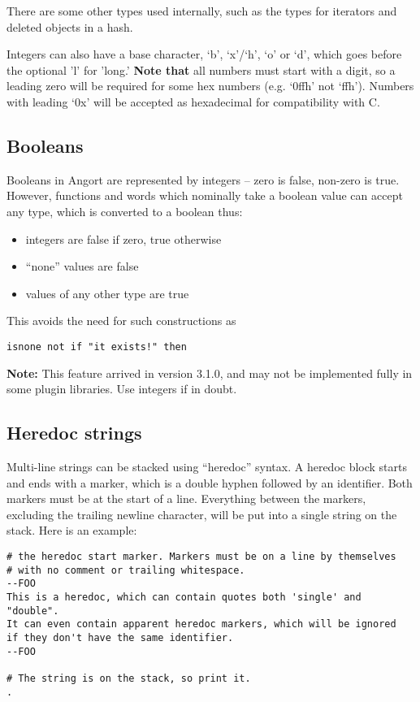 There are some other types used internally, such as the
types for iterators and deleted objects in a hash.

Integers can also have a base character, `b', `x'/`h', `o' or `d', which
goes before the optional 'l' for 'long.' \textbf{Note that} all numbers
must start with a digit, so a leading zero will be required for some 
hex numbers (e.g. `0ffh' not `ffh'). Numbers with leading `0x' will
be accepted as hexadecimal for compatibility with C.

\subsection{Booleans}
Booleans in Angort are represented by integers -- zero is false, non-zero
is true. However, functions and words which nominally take a boolean value can
accept any type, which is converted to a boolean thus:
\begin{itemize}
\item integers are false if zero, true otherwise
\item ``none'' values are false
\item values of any other type are true
\end{itemize}
This avoids the need for such constructions as
\begin{lstlisting}
isnone not if "it exists!" then
\end{lstlisting}
\textbf{Note:} This feature arrived in version 3.1.0, and may not
be implemented fully in some plugin libraries. Use integers if in doubt.

\subsection{Heredoc strings}
\label{heredoc}
Multi-line strings can be stacked 
using ``heredoc'' syntax. A heredoc block starts and ends with a marker,
which is a double hyphen followed by an identifier. Both markers
must be at the start of a line. Everything between
the markers, excluding the trailing newline character, will be put into
a single string on the stack. Here is an example:
\begin{lstlisting}
# the heredoc start marker. Markers must be on a line by themselves
# with no comment or trailing whitespace.
--FOO
This is a heredoc, which can contain quotes both 'single' and "double".
It can even contain apparent heredoc markers, which will be ignored
if they don't have the same identifier.
--FOO

# The string is on the stack, so print it.
.
\end{lstlisting}

